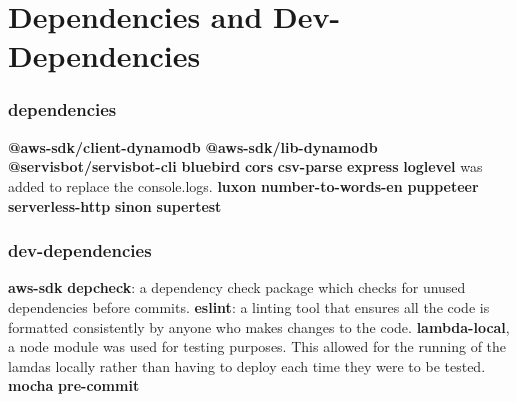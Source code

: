\documentclass[12pt,a4paper,titlepage]{report}
\begin{document}
\chapter{Dependencies and Dev-Dependencies}
\subsection*{dependencies}
\textbf{@aws-sdk/client-dynamodb}
\textbf{@aws-sdk/lib-dynamodb}
\textbf{@servisbot/servisbot-cli}
\textbf{bluebird}
\textbf{cors}
\textbf{csv-parse}
\textbf{express}
\textbf{loglevel} was added to replace the console.logs.
\textbf{luxon}
\textbf{number-to-words-en}
\textbf{puppeteer}
\textbf{serverless-http}
\textbf{sinon}
\textbf{supertest}

\subsection*{dev-dependencies}
\textbf{aws-sdk}
\textbf{depcheck}: a dependency check package which checks for unused dependencies before commits.
\textbf{eslint}: a linting tool that ensures all the code is formatted consistently by anyone who makes changes to the code.
\textbf{lambda-local}, a node module was used for testing purposes. This allowed for the running of the lamdas locally rather than having 
to deploy each time they were to be tested. 
\textbf{mocha}
\textbf{pre-commit}
\end{document}
